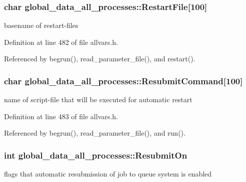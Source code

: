 \hypertarget{structglobal__data__all__processes_a67e197a37469217aa8ad32c42230b286}{
\subsubsection[{RestartFile}]{\setlength{\rightskip}{0pt plus 5cm}char {\bf global\_\-data\_\-all\_\-processes::RestartFile}\mbox{[}100\mbox{]}}}
\label{structglobal__data__all__processes_a67e197a37469217aa8ad32c42230b286}
basename of restart-\/files 

Definition at line 482 of file allvars.h.



Referenced by begrun(), read\_\-parameter\_\-file(), and restart().

\hypertarget{structglobal__data__all__processes_a59f86964a3a1b03933a787cfc280951a}{
\subsubsection[{ResubmitCommand}]{\setlength{\rightskip}{0pt plus 5cm}char {\bf global\_\-data\_\-all\_\-processes::ResubmitCommand}\mbox{[}100\mbox{]}}}
\label{structglobal__data__all__processes_a59f86964a3a1b03933a787cfc280951a}
name of script-\/file that will be executed for automatic restart 

Definition at line 483 of file allvars.h.



Referenced by begrun(), read\_\-parameter\_\-file(), and run().

\hypertarget{structglobal__data__all__processes_a6578ce0ee08f770891c662c0ab4ad10c}{
\subsubsection[{ResubmitOn}]{\setlength{\rightskip}{0pt plus 5cm}int {\bf global\_\-data\_\-all\_\-processes::ResubmitOn}}}
\label{structglobal__data__all__processes_a6578ce0ee08f770891c662c0ab4ad10c}
flags that automatic resubmission of job to queue system is enabled 

